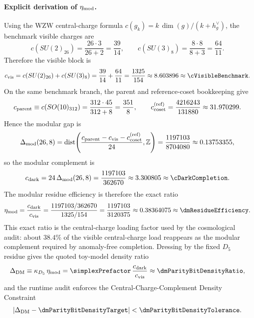 \documentclass[11pt]{article}
\begin{document}
\paragraph{Explicit derivation of $\eta_{\rm mod}$.}
Using the WZW central-charge formula $c(g_k)=k\,\dim(g)/(k+h_g^{\vee})$, the
benchmark visible charges are
\begin{equation}
 c\!\left(SU(2)_{26}\right)
 =
 \frac{26\cdot 3}{26+2}
 =
 \frac{39}{14},
 \qquad
 c\!\left(SU(3)_8\right)
 =
 \frac{8\cdot 8}{8+3}
 =
 \frac{64}{11}.
\end{equation}
Therefore the visible block is
\begin{equation}
 c_{\rm vis}
 =
 c\!\left(SU(2)_{26}\right)+c\!\left(SU(3)_8\right)
 =
 \frac{39}{14}+\frac{64}{11}
 =
 \frac{1325}{154}
 \approx
 8.603896
 \approx
 \cVisibleBenchmark.
\end{equation}
On the same benchmark branch, the parent and reference-coset bookkeeping give
\begin{equation}
 c_{\rm parent}
 \equiv
 c\!\left(SO(10)_{312}\right)
 =
 \frac{312\cdot 45}{312+8}
 =
 \frac{351}{8},
 \qquad
 c_{\rm coset}^{\rm(ref)}
 =
 \frac{4216243}{131880}
 \approx
 31.970299.
\end{equation}
Hence the modular gap is
\begin{equation}
 \Delta_{\rm mod}(26,8)
 =
 \operatorname{dist}\!\left(
 \frac{c_{\rm parent}-c_{\rm vis}-c_{\rm coset}^{\rm(ref)}}{24},
 \mathbb Z
 \right)
 =
 \frac{1197103}{8704080}
 \approx
 0.13753355,
\end{equation}
so the modular complement is
\begin{equation}
 c_{\rm dark}
 =
 24\,\Delta_{\rm mod}(26,8)
 =
 \frac{1197103}{362670}
 \approx
 3.300805
 \approx
 \cDarkCompletion.
\end{equation}
The modular residue efficiency is therefore the exact ratio
\begin{equation}
 \eta_{\rm mod}
 =
 \frac{c_{\rm dark}}{c_{\rm vis}}
 =
 \frac{1197103/362670}{1325/154}
 =
 \frac{1197103}{3120375}
 \approx
 0.38364075
 \approx
 \dmResidueEfficiency.
\end{equation}
This exact ratio is the central-charge loading factor used by the cosmological
audit: about $38.4\%$ of the visible central-charge load reappears as the
modular complement required by anomaly-free completion. Dressing by
the fixed $D_5$ residue gives the quoted toy-model density ratio
\begin{equation}
 \Delta_{\rm DM}
 \equiv
 \kappa_{D_5}\,\eta_{\rm mod}
 =
 \simplexPrefactor\,\frac{c_{\rm dark}}{c_{\rm vis}}
 \approx
 \dmParityBitDensityRatio,
\end{equation}
and the runtime audit enforces the Central-Charge-Complement Density Constraint
\begin{equation}
 \left|\Delta_{\rm DM}-\dmParityBitDensityTarget\right|<\dmParityBitDensityTolerance.
\end{equation}
\end{document}

